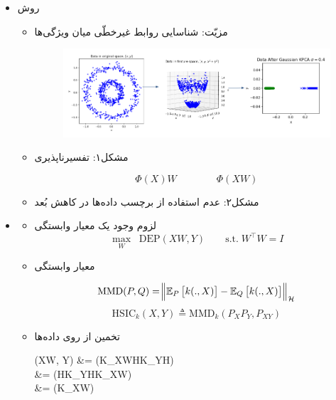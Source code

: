 \begin{rawslide}
	\begin{itemize}
		\item 
		روش
		\large{}\normalsize
		\begin{itemize}
			\item 
			مزیّت: شناسایی روابط غیرخطّی میان ویژگی‌ها
			\begin{figure}[h!]
				\centering
				\includegraphics[width=\textwidth]{pic7.jpg}
			\end{figure}
			\item 
			مشکل۱: تفسیرناپذیری
		\begin{Large}
			\[\Phi(X)W\qquad\qquad\Phi(XW)\]
		\end{Large}
			\item 
			مشکل۲: عدم استفاده از برچسب داده‌ها در کاهش بُعد
		\end{itemize}
	\end{itemize}
\end{rawslide}
\begin{rawslide}
	\begin{itemize}
		\item \large{}\normalsize
		\begin{itemize}
			\item 
			لزوم وجود یک معیار وابستگی
			\Large
			\[\max_W \;\;\mathrm{DEP}(XW,Y)\qquad \mathrm{s.t. } \;W^\top W = I\]
			\normalsize
			\item 
			معیار وابستگی
			\large{}\normalsize
			
			\begin{equation*}
			\mathrm{MMD}(P, Q) = \norm{\mathbb{E}_{P}\left[ k(., X)\right] - \mathbb{E}_{Q}\left[ k(., X)\right]}_\mathcal{H}
			\end{equation*}
			\begin{equation*}
			\mathrm{HSIC}_k(X, Y) \triangleq \mathrm{MMD}_k(P_XP_Y, P_{XY})
			\end{equation*}
			\pause
			\item 
			تخمین 
			\large{}\normalsize
			از روی داده‌ها
			\begin{flalign*}
			\HSIC(XW, Y) &=  \tr (K_{XW}HK_YH)\\
			&=  \tr (HK_YHK_{XW})\\
			&=  \tr (\Gamma K_{XW})
			\end{flalign*}
		\end{itemize}
	\end{itemize}
\end{rawslide}
